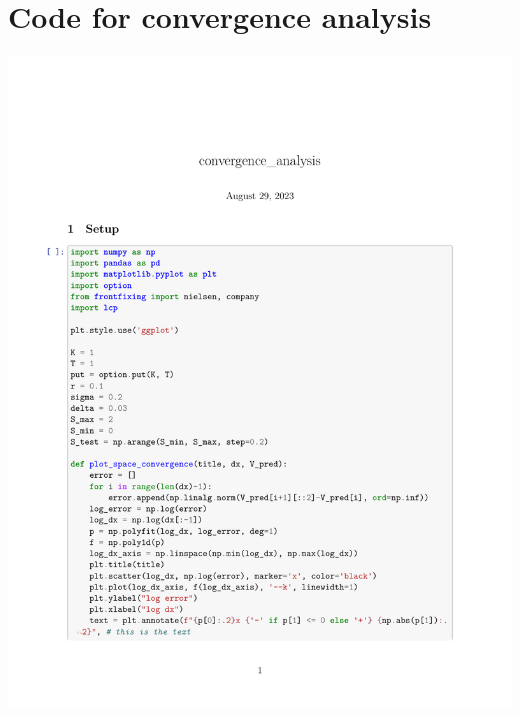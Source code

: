 \documentclass{uonmathreport}
\begin{document}
\section{Code for convergence analysis} \label{sec:convergenceanalysis}
\vspace{2cm}
\includegraphics[scale=0.9, clip, trim={2.5cm, 2.5cm 0mm 7cm}]{chapters/appendix/convergence_analysis}

\newpage
\printbibliography
\end{document}
